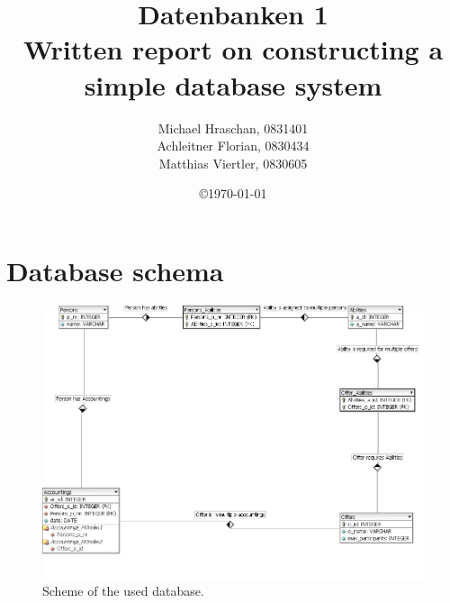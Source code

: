 \documentclass[12pt,a4paper,ngerman]{article}
\title{Datenbanken 1\\
       Written report on constructing a simple database system}
\date{\copyright \today}
\author{Michael Hraschan, 0831401 \\
				Achleitner Florian, 0830434\\
				Matthias Viertler, 0830605 \\}
\begin{document}
\maketitle

\newpage
%
\tableofcontents %
\clearpage
%
\pagestyle{plain}

\section{Database schema}

\begin{figure}[htbp]
	\centering
		\includegraphics[width=1.00\textwidth]{Images/database_design.png}
	\caption{Scheme of the used database.}
	\label{fig:database_design}
\end{figure}
\end{document}
